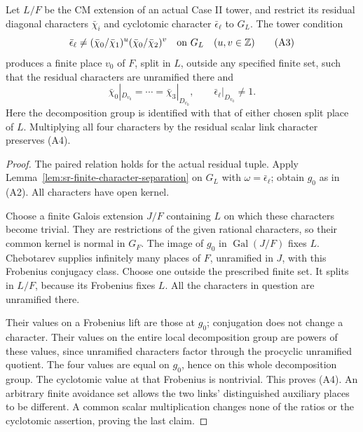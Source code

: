 \begin{srproposition}\label{prop:sr-four-actual-scalar-place}
Let \(L/F\) be the CM extension of an actual Case II
tower, and restrict its residual diagonal characters
\(\bar\chi_i\) and cyclotomic character
\(\bar\epsilon_\ell\) to \(G_L\).
The tower condition
\[
 \bar\epsilon_\ell\ne
       (\bar\chi_0/\bar\chi_1)^u
       (\bar\chi_0/\bar\chi_2)^v
                   \quad\hbox{on }G_L
                         \quad(u,v\in\mathbb Z)
 \tag{A3}
\]
produces a finite place \(v_0\) of \(F\), split in \(L\),
outside any specified finite set, such that
the residual characters are unramified there and
\[
 \bar\chi_0|_{D_{v_0}}=\cdots=\bar\chi_3|_{D_{v_0}},
              \qquad
            \bar\epsilon_\ell|_{D_{v_0}}\ne1 .
 \tag{A4}
\]
Here the decomposition group is identified with that
of either chosen split place of \(L\).
Multiplying all four characters by the residual scalar
link character preserves (A4).
\end{srproposition}
\begin{proof}
The paired relation holds for the actual residual tuple.
Apply Lemma~\ref{lem:sr-finite-character-separation}
on \(G_L\) with \(\omega=\bar\epsilon_\ell\);
obtain \(g_0\) as in (A2).
All characters have open kernel.

Choose a finite Galois extension \(J/F\) containing \(L\)
on which these characters become trivial.
They are restrictions of the given rational characters,
so their common kernel is normal in \(G_F\).
The image of \(g_0\) in \(\operatorname{Gal}(J/F)\)
fixes \(L\).
Chebotarev supplies infinitely many places of \(F\),
unramified in \(J\), with this Frobenius conjugacy class.
Choose one outside the prescribed finite set.
It splits in \(L/F\), because its Frobenius fixes \(L\).
All the characters in question are unramified there.

Their values on a Frobenius lift are those at \(g_0\);
conjugation does not change a character.
Their values on the entire local decomposition group
are powers of these values, since unramified characters
factor through the procyclic unramified quotient.
The four values are equal on \(g_0\), hence on this
whole decomposition group.
The cyclotomic value at that Frobenius is nontrivial.
This proves (A4).
An arbitrary finite avoidance set allows the two links'
distinguished auxiliary places to be different.
A common scalar multiplication changes none of the
ratios or the cyclotomic assertion, proving the last claim.
\end{proof}

